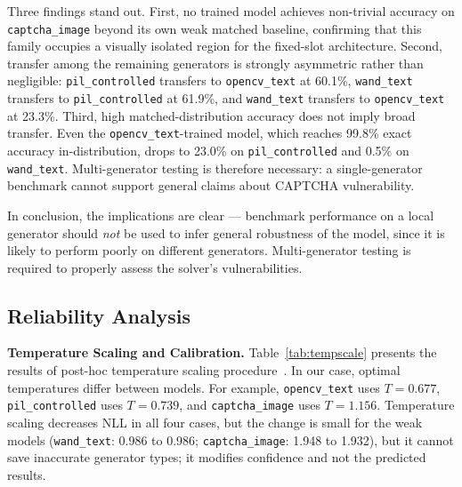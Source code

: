 \documentclass[pdflatex,sn-mathphys-num,iicol]{sn-jnl}
\begin{document}
Three findings stand out. First, no trained model achieves non-trivial
accuracy on \texttt{captcha\_image} beyond its own weak matched baseline,
confirming that this family occupies a visually isolated region for the
fixed-slot architecture. Second, transfer among the remaining generators is
strongly asymmetric rather than negligible: \texttt{pil\_controlled} transfers
to \texttt{opencv\_text} at 60.1\%, \texttt{wand\_text} transfers to
\texttt{pil\_controlled} at 61.9\%, and \texttt{wand\_text} transfers to
\texttt{opencv\_text} at 23.3\%. Third, high matched-distribution accuracy
does not imply broad transfer. Even the \texttt{opencv\_text}-trained model,
which reaches 99.8\% exact accuracy in-distribution, drops to 23.0\% on
\texttt{pil\_controlled} and 0.5\% on \texttt{wand\_text}. Multi-generator
testing is therefore necessary: a single-generator benchmark cannot support
general claims about CAPTCHA vulnerability.

In conclusion, the implications are clear --- benchmark performance on a local
generator should \emph{not} be used to infer general robustness of the model,
since it is likely to perform poorly on different generators. Multi-generator
testing is required to properly assess the solver's vulnerabilities.

\FloatBarrier
\subsection{Reliability Analysis}
\label{sec:reliability_results}

\textbf{Temperature Scaling and Calibration.}
Table~\ref{tab:tempscale} presents the results of post-hoc temperature scaling
procedure~\cite{guo2017calibration}. In our case, optimal temperatures differ
between models. For example, \texttt{opencv\_text} uses $T=0.677$,
\texttt{pil\_controlled} uses $T=0.739$, and \texttt{captcha\_image} uses
$T=1.156$. Temperature scaling decreases NLL in all four cases, but the change is small for the weak models (\texttt{wand\_text}: 0.986 to 0.986; \texttt{captcha\_image}: 1.948 to 1.932),
but it cannot save inaccurate generator types; it modifies confidence
and not the predicted results. 
\end{document}
